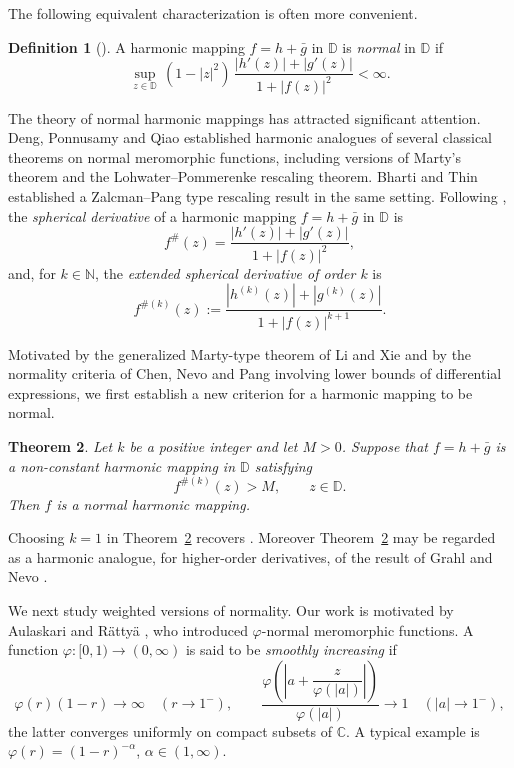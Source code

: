 \documentclass[11pt,reqno]{amsart}
\newtheorem{theorem}{Theorem}[section]
\theoremstyle{definition}
\newtheorem{definition}[theorem]{Definition}
\newcommand{\D}{\mathbb{D}}
\newcommand{\C}{\mathbb{C}}
\newcommand{\N}{\mathbb{N}}
\begin{document}
The following equivalent characterization is often more convenient.

\begin{definition}[{\cite[Proposition~2.1]{AHS}}]\label{def:normalharmeq}
A harmonic mapping $f=h+\bar g$ in $\D$ is \emph{normal} in $\D$ if
\begin{equation}\label{eq:normalharmeq}
\sup_{z\in\D}\,(1-|z|^{2})\,\frac{|h'(z)|+|g'(z)|}{1+|f(z)|^{2}}<\infty.
\end{equation}
\end{definition}

The theory of normal harmonic mappings has attracted significant attention. Deng,
Ponnusamy and Qiao \cite{DPQ} established harmonic analogues of several classical theorems
on normal meromorphic functions, including versions of Marty's theorem and the
Lohwater--Pommerenke rescaling theorem. Bharti and Thin \cite{BT} established a
Zalcman--Pang type rescaling result in the same setting. Following \cite{BT}, the
\emph{spherical derivative} of a harmonic mapping $f=h+\bar g$ in $\D$ is
\[
f^{\#}(z)=\frac{|h'(z)|+|g'(z)|}{1+|f(z)|^{2}},
\]
and, for $k\in\N$, the \emph{extended spherical derivative of order $k$} is
\begin{equation}\label{eq:extsph}
f^{\#(k)}(z):=\frac{|h^{(k)}(z)|+|g^{(k)}(z)|}{1+|f(z)|^{k+1}}.
\end{equation}

Motivated by the generalized Marty-type theorem of Li and Xie \cite{LiXie} and by the
normality criteria of Chen, Nevo and Pang \cite{CNP} involving lower bounds of differential
expressions, we first establish a new criterion for a harmonic mapping to be normal.

\begin{theorem}\label{thm:lowerbound}
Let $k$ be a positive integer and let $M>0$. Suppose that $f=h+\bar g$ is a non-constant
harmonic mapping in $\D$ satisfying
\begin{equation}\label{eq:lowerbound}
f^{\#(k)}(z)>M,\qquad z\in\D.
\end{equation}
Then $f$ is a normal harmonic mapping.
\end{theorem}

Choosing $k=1$ in Theorem~\ref{thm:lowerbound} recovers \cite[Theorem~1.4]{BT}. Moreover
Theorem~\ref{thm:lowerbound} may be regarded as a harmonic analogue, for higher-order
derivatives, of the result of Grahl and Nevo \cite{GrahlNevo}.

We next study weighted versions of normality. Our work is motivated by Aulaskari and
R\"atty\"a \cite{AR}, who introduced $\varphi$-normal meromorphic functions. A function
$\varphi\colon[0,1)\to(0,\infty)$ is said to be \emph{smoothly increasing} if
\[
\varphi(r)(1-r)\longrightarrow\infty\quad(r\to1^{-}),\qquad
\frac{\varphi\!\left(\left|a+\dfrac{z}{\varphi(|a|)}\right|\right)}{\varphi(|a|)}\longrightarrow 1
\quad(|a|\to1^{-}),
\]
the latter converges uniformly on compact subsets of $\C$. A typical example is
$\varphi(r)=(1-r)^{-\alpha}$, $\alpha\in(1,\infty)$.
\end{document}
